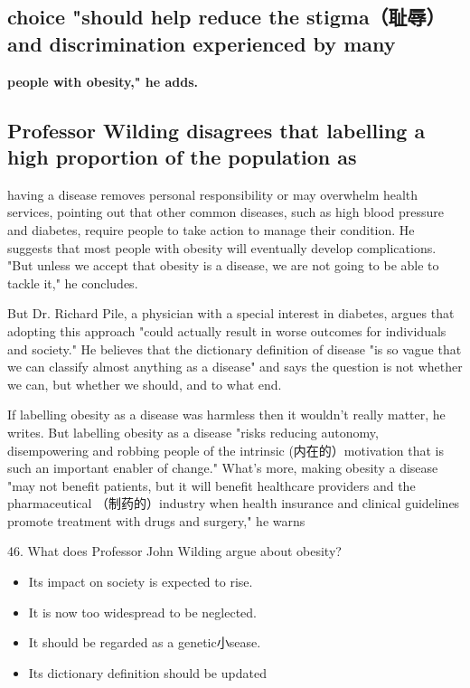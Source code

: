 \documentclass[UTF8,11pt]{ctexart}
\begin{document}
\subsection*{\textbf{choice "should help reduce the stigma（耻辱）and discrimination experienced by many}}


\textbf{people with obesity," he adds.}


\subsection*{\textbf{Professor Wilding disagrees that labelling a high proportion of the population as}}


having a disease removes personal responsibility or may overwhelm health services, pointing out that other common diseases, such as high blood pressure and diabetes, require people to take action to manage their condition. He suggests that most people with obesity will eventually develop complications. "But unless we accept that obesity is a disease, we are not going to be able to tackle it," he concludes.


But Dr. Richard Pile, a physician with a special interest in diabetes, argues that adopting this approach "could actually result in worse outcomes for individuals and society." He believes that the dictionary definition of disease "is so vague that we can classify almost anything as a disease" and says the question is not whether we can, but whether we should, and to what end.


If labelling obesity as a disease was harmless then it wouldn't really matter, he writes. But labelling obesity as a disease "risks reducing autonomy, disempowering and robbing people of the intrinsic (内在的）motivation that is such an important enabler of change." What's more, making obesity a disease "may not benefit patients, but it will benefit healthcare providers and the pharmaceutical （制药的）industry when health insurance and clinical guidelines promote treatment with drugs and surgery," he warns


46. What does Professor John Wilding argue about obesity?


\begin{itemize}[leftmargin=2em,itemsep=.2em,topsep=.4em]\item[A.] Its impact on society is expected to rise.
\item[B.] It is now too widespread to be neglected.
\item[C.] It should be regarded as a genetic小sease.
\item[D.] Its dictionary definition should be updated
\end{itemize}
\end{document}
